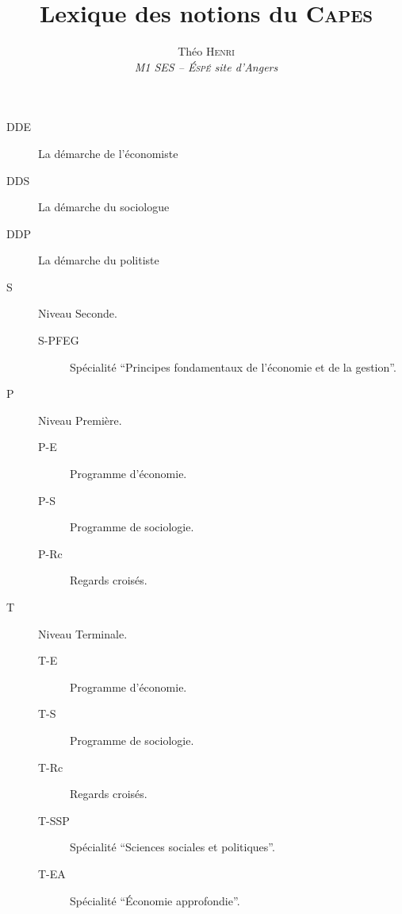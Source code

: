 \documentclass[9pt,twoside]{extarticle}
\title{Lexique des notions du \textsc{Capes}}
\author{Théo \textsc{Henri}\\\emph{M1 SES -- \textsc{Éspé} site d'Angers}}
\begin{document}
	\maketitle
	\begin{framed}
		\begin{multicols}{2}
			\begin{description}
				\item[DDE] La démarche de l'économiste
				\item[DDS] La démarche du sociologue
				\item[DDP] La démarche du politiste
				\item[S] Niveau Seconde.
				\begin{description}
					\item[S-PFEG] Spécialité \enquote{Principes fondamentaux de l'économie et de la gestion}.
				\end{description}
				\item[P] Niveau Première.
				\begin{description}
					\item[P-E] Programme d'économie.
					\item[P-S] Programme de sociologie.
					\item[P-Rc] Regards croisés.
				\end{description}
				\item[T] Niveau Terminale.
				\begin{description}
					\item[T-E] Programme d'économie.
					\item[T-S] Programme de sociologie.
					\item[T-Rc] Regards croisés.
					\item[T-SSP] Spécialité \enquote{Sciences sociales et politiques}.
					\item[T-EA] Spécialité \enquote{Économie approfondie}.
				\end{description}
			\end{description}
		\end{multicols}
	\end{framed}

	\glsaddall
	\begin{spacing}{1.2}
		\begin{multicols*}{2}
			\printglossary
		\end{multicols*}
	\end{spacing}

	\cleardoublepage
	\begin{spacing}{1.2}
		\begin{multicols*}{2}
			\printglossary[type=auteur]
		\end{multicols*}
	\end{spacing}
%
\end{document}
